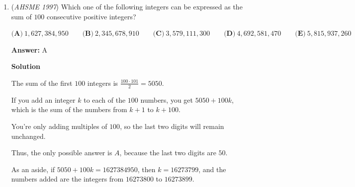 \begin{enumerate}
 Equating the radii lengths, we have $1 + BF = \sqrt{3} + CF$

 This means $BF - CF = \sqrt{3} - 1$
$BF + CF = 2$ by the 30-60-90 triangle.

 Therefore, $2BF = 2 + \sqrt{3} - 1$, and we get $BF = \frac{1}{2} + \frac{\sqrt{3}}{2}$

 The radius of the circle is $AD$, which is $BF + 1 = \frac{3}{2} + \frac{\sqrt{3}}{2}$

 Using decimal approximations, $r \approx 1.5 + \frac{1.73^+}{2} \approx 2.37$, and the answer is $\boxed{D}$.

 



\textbf{Solution 2}


From the diagram above, it is more direct to note that BC = CF + BF = r - $\sqrt{3}$ + r - 1 = 2

 



\textbf{Solution 3}

The total area of both kites is $BC \cdot OF= 2r$. Thus, $r^2 = \frac{\sqrt{3}}{2} + 2r$



	\item (\textit{AHSME 1997}) Which one of the following integers can be expressed as the sum of $100$ consecutive positive integers?


 $\textbf{(A)}\ 1,\!627,\!384,\!950\qquad\textbf{(B)}\ 2,\!345,\!678,\!910\qquad\textbf{(C)}\ 3,\!579,\!111,\!300\qquad\textbf{(D)}\ 4,\!692,\!581,\!470\qquad\textbf{(E)}\ 5,\!815,\!937,\!260$

 \textbf{Answer: }A



\textbf{Solution}

The sum of the first $100$ integers is $\frac{100\cdot 101}{2} = 5050$.

 If you add an integer $k$ to each of the $100$ numbers, you get $5050 + 100k$, which is the sum of the numbers from $k+1$ to $k+100$.

 You're only adding multiples of $100$, so the last two digits will remain unchanged.

 Thus, the only possible answer is $\boxed{A}$, because the last two digits are $50$.

 As an aside, if $5050 + 100k = 1627384950$, then $k = 16273799$, and the numbers added are the integers from $16273800$ to $16273899$.

 




\end{enumerate}
